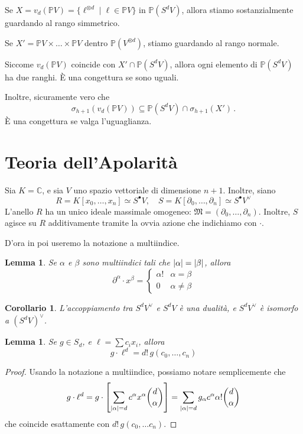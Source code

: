 \documentclass[a4paper, 11pt]{article}
\theoremstyle{definition}
\theoremstyle{plain}
\newtheorem{Lemma}[Def]{Lemma}
\newtheorem{Cor}[Def]{Corollario}
\DeclarePairedDelimiter{\abs}{\lvert}{\rvert}
\newcommand{\PP}{\mathbb{P}}
\newcommand{\C}{\mathbb{C}}
\newcommand{\MM}{\mathfrak{M}}
\begin{document}
Se $X = v_d(\PP V) = \{\ell^{\otimes d} \mid \ell \in \PP V\}$ in $\PP(S^d V)$, allora stiamo sostanzialmente guardando al rango simmetrico.

Se $X' = \PP V \times \dots \times \PP V$ dentro $\PP(V^{\otimes d})$, stiamo guardando al rango normale.

Siccome $v_d(\PP V)$ coincide con $X' \cap \PP(S^d V)$, allora ogni elemento di $\PP(S^dV)$ ha due ranghi. È una congettura se sono uguali.

Inoltre,  sicuramente vero che
\[
	\sigma_{h+1}(v_d(\PP V)) \subseteq \PP(S^d V) \cap \sigma_{h+1}(X')\,.
\]
È una congettura se valga l'uguaglianza.\vspace{0.5cm}

\noindent{}
\section{Teoria dell'Apolarità}
Sia $K = \C$, e sia $V$ uno spazio vettoriale di dimensione $n+1$. Inoltre, siano 
\[
	R = K[x_0,\dots, x_n] \simeq S^\bullet V, \quad S = K[\partial_0, \dots, \partial_n] \simeq S^\bullet V^\vee 
\]
L'anello $R$ ha un unico ideale massimale omogeneo: $\MM = (\partial_0, \dots, \partial_n)$. Inoltre, $S$ agisce su $R$ additivamente tramite la ovvia azione che indichiamo con $\cdot$.

D'ora in poi useremo la notazione a multiindice.
\begin{Lemma}\label{Lemma:dualbas}
	Se $\alpha$ e $\beta$ sono multiindici tali che $\abs{\alpha} = \abs{\beta}$, allora
	\[
		\partial^\alpha \cdot x^\beta =
		\begin{cases}
			\alpha! & \alpha = \beta \\
			0 & \alpha \neq \beta
		\end{cases}
	\]
\end{Lemma}
\begin{Cor}
	L'accoppiamento tra $S^dV^\vee$ e $S^dV$ è una dualità, e $S^d V^\vee$ è isomorfo a $(S^dV)^\vee$.
\end{Cor}
\begin{Lemma}\label{Lemma:gelld}
	Se $g \in S_d$, e $\ell = \sum c_i x_i$, allora
	\[
		g\cdot\ell^d = d!\,g(c_0, \dots, c_n)
	\]
\end{Lemma}
\begin{proof}
	Usando la notazione a multiindice, possiamo notare semplicemente che
	\[
		g\cdot \ell^d = g\cdot\left[\sum_{\abs{\alpha} = d}c^\alpha x^\alpha\binom{d}{\alpha}\right] = \sum_{\abs{\alpha} = d}g_\alpha c^\alpha\alpha!\binom{d}{\alpha}
	\]
	che coincide esattamente con $d!\,g(c_0, \dots c_n)$.
\end{proof}
\end{document}
